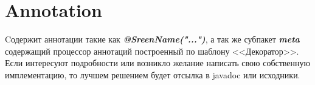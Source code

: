 \documentclass[11pt]{report}
\begin{document}
\section{Annotation}
Cодержит аннотации такие как \textit{\textbf{@SreenName("...")}}, а так же субпакет 
\textit{\textbf{meta}} содержащий процессор аннотаций построенный по шаблону <<Декоратор>>. Если интересуют подробности или возникло желание написать свою собственную имплементацию, то лучшем решением будет отсылка в javadoc или исходники.
\end{document}
